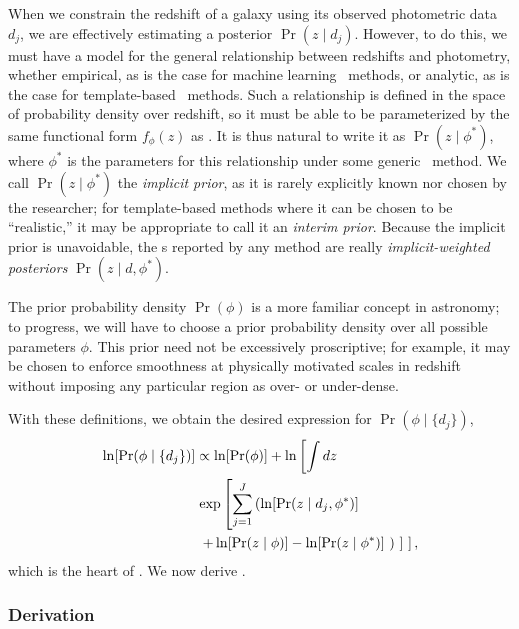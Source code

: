 When we constrain the redshift of a galaxy using its observed photometric data $d_{j}$, we are effectively estimating a posterior $\Pr(z \mid d_{j})$.
However, to do this, we must have a model for the general relationship between redshifts and photometry, whether empirical, as is the case for machine learning \pzpdf\ methods, or analytic, as is the case for template-based \pzpdf\ methods.
Such a relationship is defined in the space of probability density over redshift, so it must be able to be parameterized by the same functional form $f_{\phi}(z)$ as \nz .
It is thus natural to write it as $\Pr(z \mid \phi^{*})$, where $\phi^{*}$ is the parameters for this relationship under some generic \pzpdf\ method.
We call $\Pr(z \mid \phi^{*})$ the \textit{implicit prior}, as it is rarely explicitly known nor chosen by the researcher; for template-based methods where it can be chosen to be ``realistic,'' it may be appropriate to call it an \textit{interim prior}.
Because the implicit prior is unavoidable, the \pzpdf s reported by any method are really \textit{implicit-weighted posteriors} $\Pr(z \mid d, \phi^{*})$.

The prior probability density $\Pr(\phi)$ is a more familiar concept in astronomy; to progress, we will have to choose a prior probability density over all possible parameters $\phi$.
This prior need not be excessively proscriptive; for example, it may be chosen to enforce smoothness at physically motivated scales in redshift without imposing any particular region as over- or under-dense.

With these definitions, we obtain the desired expression for $\Pr(\phi \mid \{d_{j}\})$,
\begin{align}
\begin{split}
\eqlabel{eqn:fullpost}
\ln[\Pr(\phi \mid \{d_{j}\})] & \propto \ln[\Pr(\phi)] + \ln \left[\int dz \right.\\
& \left. \exp \left[\sum_{j=1}^{J} \left(\ln[\Pr(z \mid d_{j}, \phi^{*})] \right. \right. \right.\\
& \left. \left. \left. + \ln[\Pr(z \mid \phi)] - \ln[\Pr(z \mid \phi^{*})]\ \right)\ \right]\ \right] ,
\end{split}
\end{align}
which is the heart of \chippr.
We now derive .

\subsubsection{Derivation}

